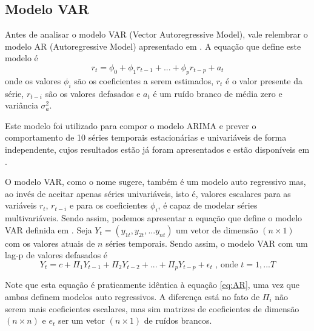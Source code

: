 \documentclass[12pt]{article}
\begin{document}
	\subsection{Modelo VAR}
	
	Antes de analisar o modelo VAR \textrm{(Vector Autoregressive Model)}, vale relembrar o modelo AR \textrm{(Autoregressive Model)} apresentado em \cite{Tsay}. A equação que define este modelo é
	\begin{equation}\label{eq:AR}
		r_t=\phi_0+\phi_1r_{t-1}+...+\phi_pr_{t-p}+a_t
	\end{equation}
	onde os valores $\phi_i$ são os coeficientes a serem estimados, $r_t$ é o valor presente da série, $r_{t-i}$ são os valores defasados e ${a_t}$ é um ruído branco de média zero e variância $\sigma^2_a$. 
	
	Este modelo foi utilizado para compor o modelo ARIMA e prever o comportamento de 10 séries temporais estacionárias e univariáveis de forma independente, cujos resultados estão já foram apresentados e estão disponíveis em \cite{git}.
	
	O modelo VAR, como o nome sugere, também é um modelo auto regressivo mas, ao invés de aceitar apenas séries univariáveis, isto é, valores escalares para as variáveis $r_t$, $r_{t-i}$ e para os coeficientes $\phi_i$, é capaz de modelar séries multivariáveis. Sendo assim, podemos apresentar a equação que define o modelo VAR definida em \cite{VAR}. Seja $Y_t=(y_{1t},y_{2t},...y_{nt})$ um vetor de dimensão $(n\times 1)$ com os valores atuais de $n$ séries temporais. Sendo assim, o modelo VAR com um \textrm{lag-p} de valores defasados é
	\begin{equation}\label{eq:VAR}
		Y_t=c+\Pi_1Y_{t-1}+\Pi_2Y_{t-2}+...+\Pi_pY_{t-p}+\epsilon_t\mbox{  , onde }t=1,...T
	\end{equation}

	Note que esta equação é praticamente idêntica à equação \ref{eq:AR}, uma vez que ambas definem modelos auto regressivos. A diferença está no fato de $\Pi_i$ não serem mais coeficientes escalares, mas sim matrizes de coeficientes de dimensão $(n\times n)$ e $e_t$ ser um vetor $(n\times1)$ de ruídos brancos. 
	
\end{document}
